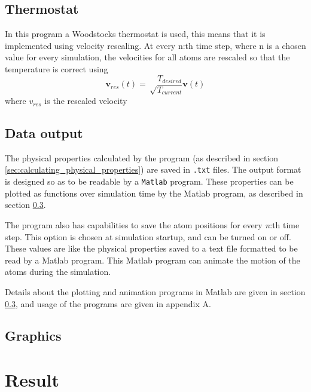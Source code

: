 \documentclass[12pt,a4paper]{article}
\begin{document}
\subsection{Thermostat}
\label{sec:thermostat}

In this program a Woodstocks thermostat is used, this means that it is implemented using velocity rescaling.
At every n:th time step, where n is a chosen value for every simulation, the velocities for all atoms are rescaled so that the temperature is correct using
\begin{equation}
\mathbf v_{res}(t)=\sqrt \frac {T_{desired}} {T_{current}} \mathbf v(t)
\end{equation}
where \( v_{res}\) is the rescaled velocity

\subsection{Data output}
\label{sec:data_output}
The physical properties calculated by the program (as described in section \ref{sec:calculating_physical_properties}) are saved in \texttt{.txt} files. The output format is designed so as to be readable by a \texttt{Matlab} program. These properties can be plotted as functions over simulation time by the Matlab program, as described in section \ref{sec:graphics}. 

The program also has capabilities to save the atom positions for every \emph{n}:th time step. This option is chosen at simulation startup, and can be turned on or off. These values are like the physical properties saved to a text file formatted to be read by a Matlab program. This Matlab program can animate the motion of the atoms during the simulation. 

Details about the plotting and animation programs in Matlab are given in section \ref{sec:graphics}, and usage of the programs are given in appendix A.

\subsection{Graphics}
\label{sec:graphics}


\newpage
\section{Result}
\label{sec:Result}
\end{document}

